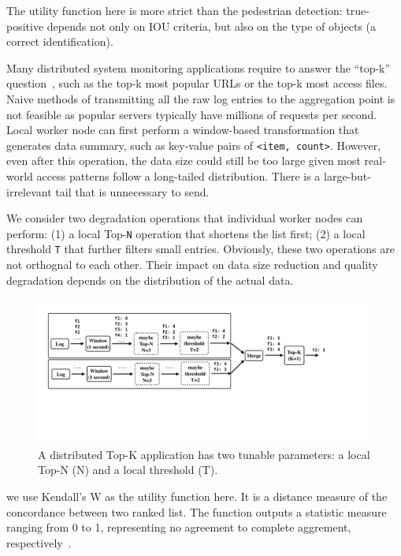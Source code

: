 The utility function here is more strict than the pedestrian detection:
true-positive depends not only on IOU criteria, but also on the type of objects
(a correct identification).

 Many distributed system monitoring applications
require to answer the ``top-k'' question~\cite{babcock2003distributed}, such as
the top-k most popular URLs or the top-k most access files. Naive methods of
transmitting all the raw log entries to the aggregation point is not feasible as
popular servers typically have millions of requests per second. Local worker
node can first perform a window-based transformation that generates data
summary, such as key-value pairs of \texttt{<item, count>}. However, even after
this operation, the data size could still be too large given most real-world
access patterns follow a long-tailed distribution. There is a
large-but-irrelevant tail that is unnecessary to send.

We consider two degradation operations that individual worker nodes can perform:
(1) a local Top-\texttt{N} operation that shortens the list first; (2) a local
threshold \texttt{T} that further filters small entries. Obviously, these two
operations are not orthognal to each other. Their impact on data size reduction
and quality degradation depends on the distribution of the actual data.

\begin{figure}
  \centering
  \includegraphics[width=\linewidth]{figures/topk.pdf}
  \caption{A distributed Top-K application has two tunable parameters: a local
    Top-N (N) and a local threshold (T).}
  \label{fig:topk}
\end{figure}


we use Kendall's W as the utility function here. It is a distance measure of the
concordance between two ranked list. The function outputs a statistic measure
ranging from 0 to 1, representing no agreement to complete aggrement,
respectively~\cite{abdi2007kendall}.

